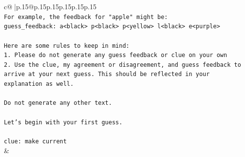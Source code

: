 \documentclass{article}
\begin{document}
{\begin{supertabular}{c@{$\;$}|p{.15\linewidth}@{}p{.15\linewidth}p{.15\linewidth}p{.15\linewidth}p{.15\linewidth}p{.15\linewidth}}
{{{\\ 
\texttt{For example, the feedback for "apple" might be:} \\
\texttt{guess\_feedback: a<black> p<black> p<yellow> l<black> e<purple>} \\
\\ 
\texttt{Here are some rules to keep in mind:} \\
\texttt{1. Please do not generate any guess feedback or clue on your own} \\
\texttt{2. Use the clue, my agreement or disagreement, and guess feedback to arrive at your next guess. This should be reflected in your explanation as well.} \\
\\ 
\texttt{Do not generate any other text.} \\
\\ 
\texttt{Let's begin with your first guess.} \\
\\ 
\texttt{clue: make current} \\
            }
        }
    }
    & \\ \\


\end{supertabular}}
\end{document}
